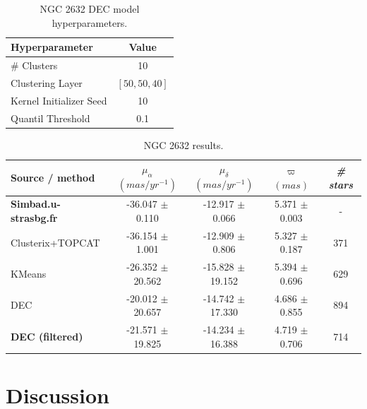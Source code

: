 \documentclass[11pt, a4paper, english]{book}
\begin{document}
\begin{table}[H]
  \begin{center}
    \begin{tabular}{l|c}
      \textbf{Hyperparameter} & \textbf{Value} \\
      \hline
      \# Clusters & 10 \\
      Clustering Layer & $\left[ 50, 50, 40 \right]$ \\
      Kernel Initializer Seed & 10 \\
      Quantil Threshold & 0.1 \\
    \end{tabular}
    \caption{NGC 2632 DEC model hyperparameters.}
    \label{tab:hyperparameters_ngc_2632}
  \end{center}
\end{table}

\begin{table}[H]
  \begin{center}
    \begin{tabular}{l|c|c|c|c}
      \textbf{Source / method} & \textbf{$\mu_{\alpha}$ $(mas/yr^{-1})$} & \textbf{$\mu_{\delta}$ $(mas/yr^{-1})$} & \textbf{$\varpi$ $(mas)$} & \emph{\# stars} \\
      \hline
      \textbf{Simbad.u-strasbg.fr} & -36.047 $\pm$ 0.110 & -12.917 $\pm$ 0.066 & 5.371 $\pm$ 0.003 & - \\
      Clusterix+TOPCAT & -36.154 $\pm$ 1.001 & -12.909 $\pm$ 0.806 & 5.327 $\pm$ 0.187 & 371 \\
      KMeans & -26.352 $\pm$ 20.562 & -15.828 $\pm$ 19.152 & 5.394 $\pm$ 0.696 & 629 \\
      DEC & -20.012 $\pm$ 20.657 & -14.742 $\pm$ 17.330 & 4.686 $\pm$ 0.855 & 894 \\
      \textbf{DEC (filtered)} & -21.571 $\pm$ 19.825 & -14.234 $\pm$ 16.388 & 4.719 $\pm$ 0.706 & 714 \\
    \end{tabular}
    \caption{NGC 2632 results.}
    \label{tab:results_ngc_2632}
  \end{center}
\end{table}


\section{Discussion}
\end{document}
